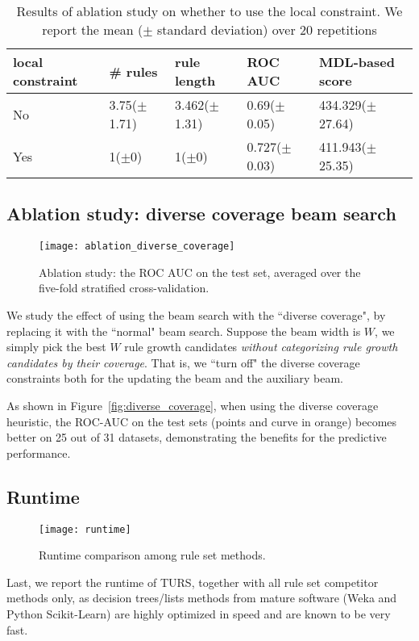 \begin{table}[ht]
\centering
\begin{tabular}{lllll}
  \hline
local constraint & \# rules & rule length & ROC AUC & MDL-based score \\ 
  \hline
No & 3.75($\pm$1.71) & 3.462($\pm$1.31) & 0.69($\pm$0.05) & 434.329($\pm$27.64) \\ 
  Yes & 1($\pm$0) & 1($\pm$0) & 0.727($\pm$0.03) & 411.943($\pm$25.35) \\ 
   \hline
\end{tabular}
\caption{Results of ablation study on whether to use the local constraint. We report the mean ($\pm$ standard deviation) over $20$ repetitions } \label{table:ablation_simu}
\end{table}

\subsection{Ablation study: diverse coverage beam search}
\begin{figure}[ht] \label{fig:diverse_coverage}
	\texttt{[image: ablation\_diverse\_coverage]}
	\caption{Ablation study: the ROC AUC on the test set, averaged over the five-fold stratified cross-validation.}
	\label{fig:heatmap_modelcomplexity}
\end{figure}
We study the effect of using the beam search with the ``diverse coverage", by replacing it with the ``normal" beam search. Suppose the beam width is $W$, we simply pick the best $W$ rule growth candidates \emph{without categorizing rule growth candidates by their coverage}. That is, we ``turn off" the diverse coverage constraints both for the updating the beam and the auxiliary beam. 

As shown in Figure~\ref{fig:diverse_coverage}, when using the diverse coverage heuristic, the ROC-AUC on the test sets (points and curve in orange) becomes better on 25 out of 31 datasets, demonstrating the benefits for the predictive performance. 

\subsection{Runtime}
\begin{figure}[ht] \label{fig:runtime}
	\texttt{[image: runtime]}
	\caption{Runtime comparison among rule set methods.}	 
	\label{fig:heatmap_modelcomplexity}
\end{figure}
Last, we report the runtime of TURS, together with all rule set competitor methods only, as decision trees/lists methods from mature software (Weka and Python Scikit-Learn) are highly optimized in speed and are known to be very fast. 

